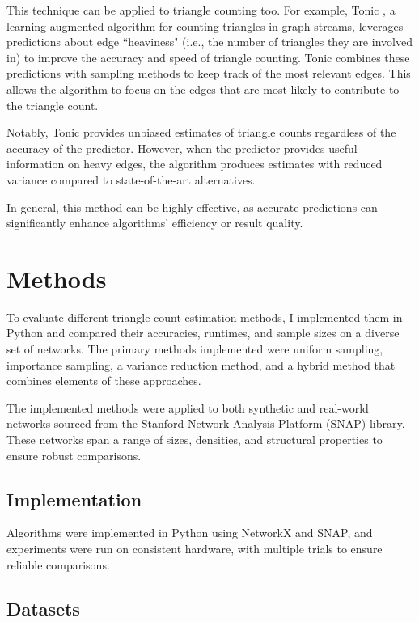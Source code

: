 \documentclass[11pt]{article}
\begin{document}
This technique can be applied to triangle counting too.
For example, Tonic \cite{boldrin_fast_2024}, a learning-augmented algorithm for counting triangles in graph streams, leverages predictions about edge ``heaviness" (i.e., the number of triangles they are involved in) to improve the accuracy and speed of triangle counting.
Tonic combines these predictions with sampling methods to keep track of the most relevant edges.
This allows the algorithm to focus on the edges that are most likely to contribute to the triangle count.

Notably, Tonic provides unbiased estimates of triangle counts regardless of the accuracy of the predictor.
However, when the predictor provides useful information on heavy edges, the algorithm produces estimates with reduced variance compared to state-of-the-art alternatives.

In general, this method can be highly effective, as accurate predictions can significantly enhance algorithms' efficiency or result quality.

\newpage

\section{Methods}

To evaluate different triangle count estimation methods, I implemented them in Python and compared their accuracies, runtimes, and sample sizes on a diverse set of networks.
The primary methods implemented were uniform sampling, importance sampling, a variance reduction method, and a hybrid method that combines elements of these approaches. 

The implemented methods were applied to both synthetic and real-world networks sourced from the \href{https://snap.stanford.edu/index.html}{Stanford Network Analysis Platform (SNAP) library}.
These networks span a range of sizes, densities, and structural properties to ensure robust comparisons.

\subsection{Implementation}

Algorithms were implemented in Python using NetworkX and SNAP, and experiments were run on consistent hardware, with multiple trials to ensure reliable comparisons.

\subsection{Datasets}
\end{document}
